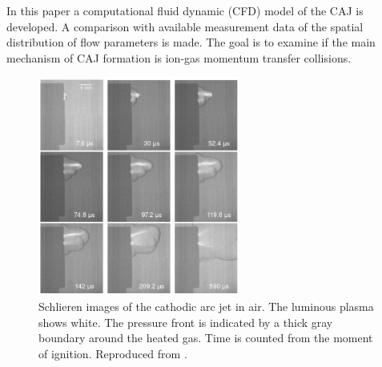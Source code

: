 \documentclass[a4paper]{iacas}%
\begin{document}
In this paper a computational fluid dynamic (CFD) model of the CAJ is developed. A comparison with available measurement data of the spatial distribution of flow parameters is made. The goal is to examine if the main mechanism of CAJ formation is ion-gas momentum transfer collisions.

\begin{figure}
	\centering
	\includegraphics[width=0.59\textwidth]{CAJ_highres.png}
	\caption{Schlieren images of the cathodic arc jet in air. The luminous plasma shows white. The pressure front is indicated by a thick gray boundary around the heated gas. Time is counted from the moment of ignition. Reproduced from \cite{KR}.}
	\label{fig:CAJ}
\end{figure}
\end{document}
